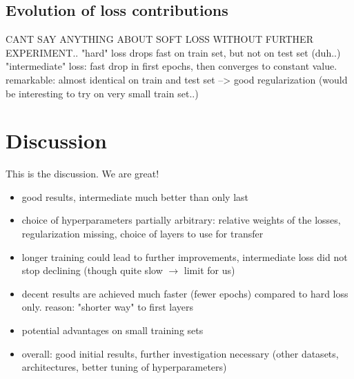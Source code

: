 \documentclass[10pt,twocolumn,letterpaper]{article}
\begin{document}
\subsection{Evolution of loss contributions}

CANT SAY ANYTHING ABOUT SOFT LOSS WITHOUT FURTHER EXPERIMENT.. 
"hard" loss drops fast on train set, but not on test set (duh..)
"intermediate" loss: fast drop in first epochs, then converges to constant value. remarkable: almost identical on train and test set --> good regularization
(would be interesting to try on very small train set..)


\section{Discussion}
This is the discussion. We are great!

\begin{itemize}
	\item good results, intermediate much better than only last
	\item choice of hyperparameters partially arbitrary: relative weights of the losses, regularization missing, choice of layers to use for transfer
	\item longer training could lead to further improvements, intermediate loss did not stop declining (though quite slow $ \rightarrow $ limit for us)
	\item decent results are achieved much faster (fewer epochs) compared to hard loss only. reason: "shorter way" to first layers
	\item potential advantages on small training sets
	\item overall: good initial results, further investigation necessary (other datasets, architectures, better tuning of hyperparameters)
\end{itemize}

{\small


}
\end{document}
